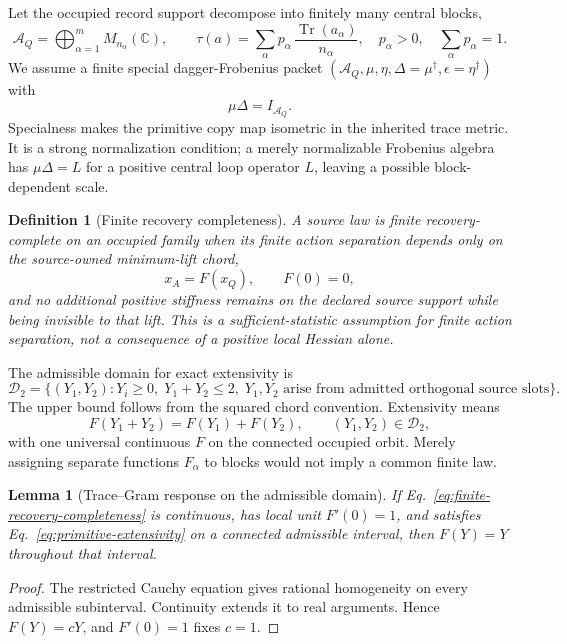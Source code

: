 \documentclass[11pt]{article}
\newtheorem{definition}{Definition}
\newtheorem{lemma}{Lemma}
\newcommand{\Tr}{\operatorname{Tr}}
\begin{document}
Let the occupied record support decompose into finitely many central blocks,
\begin{equation}
 \mathcal A_Q=\bigoplus_{\alpha=1}^m M_{n_\alpha}(\mathbb C),
 \qquad
 \tau(a)=\sum_\alpha p_\alpha\,\frac{\Tr(a_\alpha)}{n_\alpha},
 \quad p_\alpha>0,
 \quad \sum_\alpha p_\alpha=1.
 \label{eq:finite-record-algebra}
\end{equation}
We assume a finite special dagger-Frobenius packet
\((\mathcal A_Q,\mu,\eta,\Delta=\mu^\dagger,\epsilon=\eta^\dagger)\) with
\begin{equation}
 \mu\Delta=I_{\mathcal A_Q}.
 \label{eq:specialness}
\end{equation}
Specialness makes the primitive copy map isometric in the inherited trace
metric.  It is a strong normalization condition; a merely normalizable
Frobenius algebra has \(\mu\Delta=L\) for a positive central loop operator
\(L\), leaving a possible block-dependent scale.

\begin{definition}[Finite recovery completeness]
A source law is \emph{finite recovery-complete} on an occupied family when
its finite action separation depends only on the source-owned minimum-lift
chord,
\begin{equation}
 x_A=F(x_Q),\qquad F(0)=0,
 \label{eq:finite-recovery-completeness}
\end{equation}
and no additional positive stiffness remains on the declared source support
while being invisible to that lift.  This is a sufficient-statistic
assumption for finite action separation, not a consequence of a positive
local Hessian alone.
\end{definition}

The admissible domain for exact extensivity is
\begin{equation}
 \mathcal D_2=\{(Y_1,Y_2):Y_i\geq0,\;Y_1+Y_2\leq2,\;
 Y_1,Y_2\text{ arise from admitted orthogonal source slots}\}.
 \label{eq:additive-domain}
\end{equation}
The upper bound follows from the squared chord convention.  Extensivity means
\begin{equation}
 F(Y_1+Y_2)=F(Y_1)+F(Y_2),\qquad (Y_1,Y_2)\in\mathcal D_2,
 \label{eq:primitive-extensivity}
\end{equation}
with one universal continuous \(F\) on the connected occupied orbit.  Merely
assigning separate functions \(F_\alpha\) to blocks would not imply a common
finite law.

\begin{lemma}[Trace--Gram response on the admissible domain]
If Eq.~\eqref{eq:finite-recovery-completeness} is continuous, has local unit
\(F'(0)=1\), and satisfies Eq.~\eqref{eq:primitive-extensivity} on a connected
admissible interval, then \(F(Y)=Y\) throughout that interval.
\end{lemma}
\begin{proof}
The restricted Cauchy equation gives rational homogeneity on every admissible
subinterval.  Continuity extends it to real arguments.  Hence \(F(Y)=cY\),
and \(F'(0)=1\) fixes \(c=1\).
\end{proof}
\end{document}
